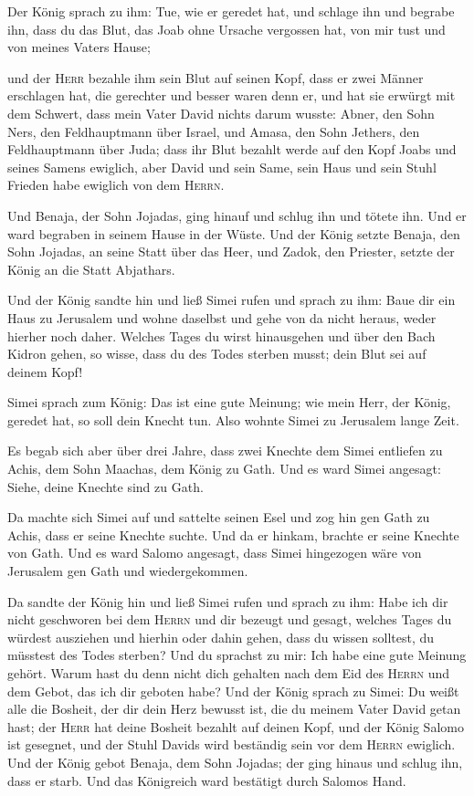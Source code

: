  Der König sprach zu ihm: Tue, wie er geredet hat, und
schlage ihn und begrabe ihn, dass du das Blut, das Joab ohne Ursache
vergossen hat, von mir tust und von meines Vaters Hause;

 und der \textsc{Herr} bezahle ihm sein Blut auf seinen
Kopf, dass er zwei Männer erschlagen hat, die gerechter und besser waren
denn er, und hat sie erwürgt mit dem Schwert, dass mein Vater David
nichts darum wusste: Abner, den Sohn Ners, den Feldhauptmann über
Israel, und Amasa, den Sohn Jethers, den Feldhauptmann über Juda;
 dass ihr Blut bezahlt werde auf den Kopf Joabs und
seines Samens ewiglich, aber David und sein Same, sein Haus und sein
Stuhl Frieden habe ewiglich von dem \textsc{Herrn}.

 Und Benaja, der Sohn Jojadas, ging hinauf und schlug ihn
und tötete ihn. Und er ward begraben in seinem Hause in der Wüste.
 Und der König setzte Benaja, den Sohn Jojadas, an seine
Statt über das Heer, und Zadok, den Priester, setzte der König an die
Statt Abjathars.

 Und der König sandte hin und ließ Simei rufen und sprach
zu ihm: Baue dir ein Haus zu Jerusalem und wohne daselbst und gehe von
da nicht heraus, weder hierher noch daher.  Welches Tages
du wirst hinausgehen und über den Bach Kidron gehen, so wisse, dass du
des Todes sterben musst; dein Blut sei auf deinem Kopf!

 Simei sprach zum König: Das ist eine gute Meinung; wie
mein Herr, der König, geredet hat, so soll dein Knecht tun. Also wohnte
Simei zu Jerusalem lange Zeit.

 Es begab sich aber über drei Jahre, dass zwei Knechte
dem Simei entliefen zu Achis, dem Sohn Maachas, dem König zu Gath. Und
es ward Simei angesagt: Siehe, deine Knechte sind zu Gath.

 Da machte sich Simei auf und sattelte seinen Esel und
zog hin gen Gath zu Achis, dass er seine Knechte suchte. Und da er
hinkam, brachte er seine Knechte von Gath.  Und es ward
Salomo angesagt, dass Simei hingezogen wäre von Jerusalem gen Gath und
wiedergekommen.

 Da sandte der König hin und ließ Simei rufen und sprach
zu ihm: Habe ich dir nicht geschworen bei dem \textsc{Herrn} und dir
bezeugt und gesagt, welches Tages du würdest ausziehen und hierhin oder
dahin gehen, dass du wissen solltest, du müsstest des Todes sterben? Und
du sprachst zu mir: Ich habe eine gute Meinung gehört. 
Warum hast du denn nicht dich gehalten nach dem Eid des \textsc{Herrn}
und dem Gebot, das ich dir geboten habe?  Und der König
sprach zu Simei: Du weißt alle die Bosheit, der dir dein Herz bewusst
ist, die du meinem Vater David getan hast; der \textsc{Herr} hat deine
Bosheit bezahlt auf deinen Kopf,  und der König Salomo
ist gesegnet, und der Stuhl Davids wird beständig sein vor dem
\textsc{Herrn} ewiglich.  Und der König gebot Benaja, dem
Sohn Jojadas; der ging hinaus und schlug ihn, dass er starb. Und das
Königreich ward bestätigt durch Salomos Hand.

